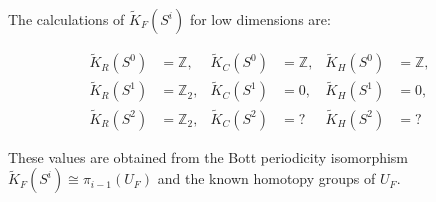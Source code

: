 The calculations of $\tilde{K}_F(S^i)$ for low dimensions are:

$$\begin{aligned}
\tilde{K}_R(S^0) &= \mathbb{Z}, & \tilde{K}_C(S^0) &= \mathbb{Z}, & \tilde{K}_H(S^0) &= \mathbb{Z}, \\
\tilde{K}_R(S^1) &= \mathbb{Z}_2, & \tilde{K}_C(S^1) &= 0, & \tilde{K}_H(S^1) &= 0, \\
\tilde{K}_R(S^2) &= \mathbb{Z}_2, & \tilde{K}_C(S^2) &= ? & \tilde{K}_H(S^2) &= ?
\end{aligned}$$

These values are obtained from the Bott periodicity isomorphism $\tilde{K}_F(S^i) \cong \pi_{i-1}(U_F)$ and the known homotopy groups of $U_F$.
